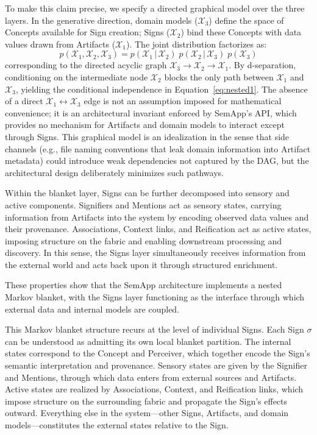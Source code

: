 \documentclass[11pt,a4paper]{article}
\theoremstyle{definition}
\newcommand{\bp}{p}
\begin{document}
To make this claim precise, we specify a directed graphical model over the three layers. In the generative direction, domain models ($\mathcal{X}_3$) define the space of Concepts available for Sign creation; Signs ($\mathcal{X}_2$) bind these Concepts with data values drawn from Artifacts ($\mathcal{X}_1$). The joint distribution factorizes as:
\begin{equation}
\label{eq:dag_factorization}
\bp(\mathcal{X}_1, \mathcal{X}_2, \mathcal{X}_3) = \bp(\mathcal{X}_1 \,|\, \mathcal{X}_2)\;\bp(\mathcal{X}_2 \,|\, \mathcal{X}_3)\;\bp(\mathcal{X}_3)
\end{equation}
corresponding to the directed acyclic graph $\mathcal{X}_3 \to \mathcal{X}_2 \to \mathcal{X}_1$. By d-separation, conditioning on the intermediate node $\mathcal{X}_2$ blocks the only path between $\mathcal{X}_1$ and $\mathcal{X}_3$, yielding the conditional independence in Equation~\ref{eq:nested1}. The absence of a direct $\mathcal{X}_1 \leftrightarrow \mathcal{X}_3$ edge is not an assumption imposed for mathematical convenience; it is an architectural invariant enforced by SemApp's API, which provides no mechanism for Artifacts and domain models to interact except through Signs. This graphical model is an idealization in the sense that side channels (e.g., file naming conventions that leak domain information into Artifact metadata) could introduce weak dependencies not captured by the DAG, but the architectural design deliberately minimizes such pathways.

Within the blanket layer, Signs can be further decomposed into sensory and active components. Signifiers and Mentions act as sensory states, carrying information from Artifacts into the system by encoding observed data values and their provenance. Associations, Context links, and Reification act as active states, imposing structure on the fabric and enabling downstream processing and discovery. In this sense, the Signs layer simultaneously receives information from the external world and acts back upon it through structured enrichment.

These properties show that the SemApp architecture implements a nested Markov blanket, with the Signs layer functioning as the interface through which external data and internal models are coupled.

This Markov blanket structure recurs at the level of individual Signs. Each Sign $\sigma$ can be understood as admitting its own local blanket partition. The internal states correspond to the Concept and Perceiver, which together encode the Sign’s semantic interpretation and provenance. Sensory states are given by the Signifier and Mentions, through which data enters from external sources and Artifacts. Active states are realized by Associations, Context, and Reification links, which impose structure on the surrounding fabric and propagate the Sign’s effects outward. Everything else in the system—other Signs, Artifacts, and domain models—constitutes the external states relative to the Sign.
\end{document}
